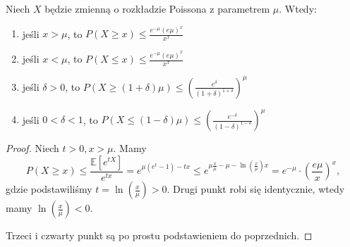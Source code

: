 \begin{theorem}
    Niech \(X\) będzie zmienną o rozkładzie Poissona z parametrem \(\mu\). Wtedy:
    \begin{enumerate}
        \item jeśli \(x>\mu\), to \(P \left( X \ge x \right) \le \frac{e^{-\mu} \left( e\mu \right) ^{x}}{x^{x}}\)
        \item jeśli \(x < \mu\), to \(P \left( X \le x \right) \le \frac{e^{-\mu} \left( e\mu \right) ^{x}}{x^{x}}\)
        \item jeśli \(\delta > 0\), to \(P \left( X \ge \left( 1+\delta \right) \mu \right) \le \left( \frac{e^{\delta}}{ \left( 1+\delta \right) ^{1+\delta}} \right) ^{\mu}\)
        \item jeśli \(0 < \delta < 1\), to \(P \left( X \le \left( 1-\delta \right) \mu \right) \le \left( \frac{e^{-\delta}}{ \left( 1-\delta \right) ^{1-\delta}} \right) ^{\mu}\)
    \end{enumerate}
\end{theorem}
\begin{proof}
    Niech \(t>0, x>\mu\). Mamy \[ P \left( X\ge x \right) \le \frac{\mathbb{E} \left[ e^{tX} \right] }{e^{tx}} = e^{\mu \left( e^{t}-1 \right) -tx}  \le e^{\mu \frac{x}{\mu}- \mu-\ln \left( \frac{x}{\mu} \right) x} = e^{-\mu}\cdot \left( \frac{e\mu}{x} \right) ^{x} ,\] 
    gdzie podstawiliśmy \(t= \ln \left( \frac{x}{\mu} \right) > 0 \). Drugi punkt robi się identycznie, wtedy mamy \(\ln \left( \frac{x}{\mu} \right) < 0\).

    Trzeci i czwarty punkt są po prostu podstawieniem do poprzednich.
\end{proof}

